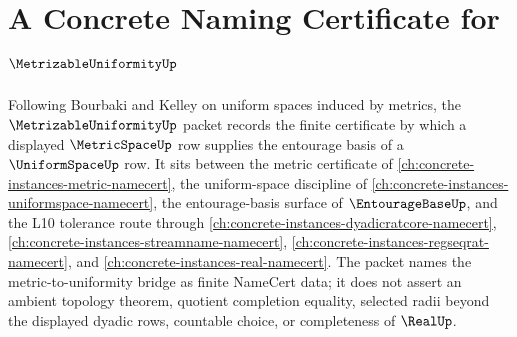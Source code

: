 \chapter{A Concrete Naming Certificate for $\MetrizableUniformityUp$}
\label{ch:concrete-instances-metrizable-uniformity-namecert}

Following Bourbaki and Kelley on uniform spaces induced by metrics, the $\MetrizableUniformityUp$ packet records the finite certificate by which a displayed $\MetricSpaceUp$ row supplies the entourage basis of a $\UniformSpaceUp$ row. It sits between the metric certificate of \autoref{ch:concrete-instances-metric-namecert}, the uniform-space discipline of \autoref{ch:concrete-instances-uniformspace-namecert}, the entourage-basis surface of $\EntourageBaseUp$, and the L10 tolerance route through \autoref{ch:concrete-instances-dyadicratcore-namecert}, \autoref{ch:concrete-instances-streamname-namecert}, \autoref{ch:concrete-instances-regseqrat-namecert}, and \autoref{ch:concrete-instances-real-namecert}. The packet names the metric-to-uniformity bridge as finite NameCert data; it does not assert an ambient topology theorem, quotient completion equality, selected radii beyond the displayed dyadic rows, countable choice, or completeness of $\RealUp$.

